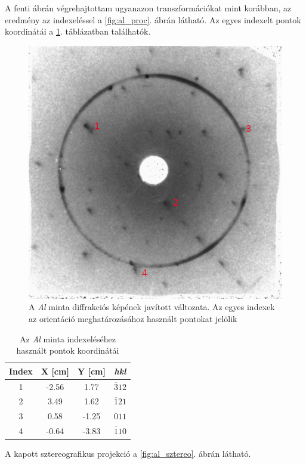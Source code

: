 \documentclass[12pt,a4paper]{article}
\begin{document}
A fenti ábrán végrehajtottam ugyanazon transzformációkat mint korábban, az eredmény az indexeléssel a \ref{fig:al_proc}. ábrán látható. Az egyes indexelt pontok koordinátái a \ref{tab:al}. táblázatban találhatók.
\begin{figure}[!h]
\centering
\includegraphics[scale=1.8]{al_proc}
\caption{A \emph{Al} minta diffrakciós képének javított változata. Az egyes indexek az orientáció meghatározásához használt pontokat jelölik}
\label{al:proc}
\end{figure}
\newpage
\begin{table}[!h]
\begin{center}
\begin{tabular}{|c|c|c|c|}
\hline
Index & X [cm] & Y [cm] & \emph{hkl} \\
\hline
1 & -2.56 & 1.77 & ${\overline{3}12}$\\
\hline
2 & 3.49 & 1.62 & ${\overline{1}21}$\\
\hline
3 & 0.58 & -1.25 & ${011}$\\
\hline
4 & -0.64 & -3.83 & ${\overline{1}10}$\\
\hline
\end{tabular}
\caption{Az \emph{Al} minta indexeléséhez használt pontok koordinátái}
\label{tab:al}
\end{center}
\end{table}
A kapott sztereografikus projekció a \ref{fig:al_sztereo}. ábrán látható.\\
\end{document}
